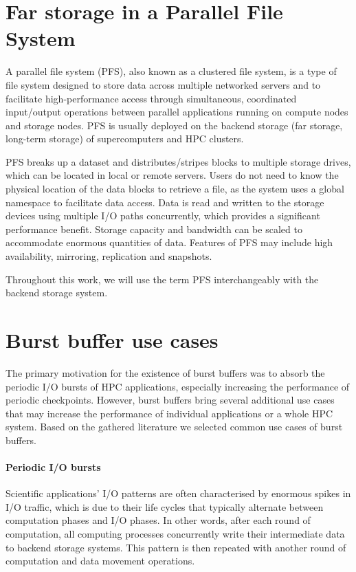 \documentclass[thesis-en.tex]{subfiles}
\begin{document}
\section{Far storage in a Parallel File System}
A parallel file system (PFS), also known as a clustered file system, is a type of file system designed to store data across multiple networked servers and to facilitate high-performance access through simultaneous, coordinated input/output operations between parallel applications running on compute nodes and storage nodes. PFS is usually deployed on the backend storage (far storage, long-term storage) of supercomputers and HPC clusters.

PFS breaks up a dataset and distributes/stripes blocks to multiple storage drives, which can be located in local or remote servers. Users do not need to know the physical location of the data blocks to retrieve a file, as the system uses a global namespace to facilitate data access. Data is read and written to the storage devices using multiple I/O paths concurrently, which provides a significant performance benefit. Storage capacity and bandwidth can be scaled to accommodate enormous quantities of data. Features of PFS may include high availability, mirroring, replication and snapshots.

Throughout this work, we will use the term PFS interchangeably with the backend storage system.

\section{Burst buffer use cases}
The primary motivation for the existence of burst buffers was to absorb the periodic I/O bursts of HPC applications, especially increasing the performance of periodic checkpoints. However, burst buffers bring several additional use cases that may increase the performance of individual applications or a whole HPC system. Based on the gathered literature \cite{osti_1328312,bhimji2016accelerating,6232369,8891051,10.5555/3108096.3108100,romanus2015challenges,lockwood-blog} we selected common use cases of burst buffers.

\paragraph{Periodic I/O bursts}
Scientific applications' I/O patterns are often characterised by enormous spikes in I/O traffic, which is due to their life cycles that typically alternate between computation phases and I/O phases. In other words, after each round of computation, all computing processes concurrently write their intermediate data to backend storage systems. This pattern is then repeated with another round of computation and data movement operations. 
\end{document}
